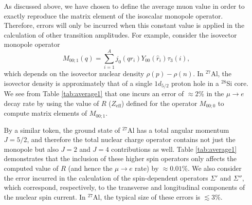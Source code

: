\documentclass{book}[12pt]
\begin{document}
As discussed above, we have chosen to define the average muon value in order to exactly reproduce the matrix element of the isoscalar monopole operator. Therefore, errors will only be incurred when this constant value is applied in the calculation of other transition amplitudes. For example, consider the isovector monopole operator 
\begin{equation}
M_{00;1}(q)=\sum_{i=1}^A j_0(qr_i)Y_{00}(\hat{r}_i)\tau_3(i),
\end{equation}
which depends on the isovector nuclear density $\rho(p)-\rho(n)$. In $^{27}$Al, the isovector density is approximately that of a single $1d_{5/2}$ proton hole in a $^{28}$Si core. We see from Table \ref{tab:average1} that one incurs an error of $\approx 2$\% in the $\mu\rightarrow e$ decay rate by using the value of $R$ ($Z_\mathrm{eff}$) defined for the operator $M_{00;0}$ to compute matrix elements of $M_{00;1}$.

By a similar token, the ground state of $^{27}$Al has a total angular momentum $J=5/2$, and therefore the total nuclear charge operator contains not just the monopole but also $J=2$ and $J=4$ contributions as well. Table \ref{tab:average1} demonstrates that the inclusion of these higher spin operators only affects the computed value of $R$ (and hence the $\mu\rightarrow e$ rate) by $\approx 0.01$\%. We also consider the error incurred in the calculation of the spin-dependent operators $\Sigma'$ and $\Sigma''$, which correspond, respectively, to the transverse and longitudinal components of the nuclear spin current. In $^{27}$Al, the typical size of these errors is $\lesssim 3$\%.
\end{document}
